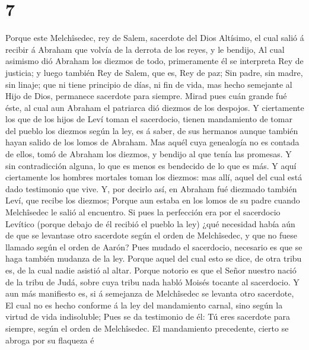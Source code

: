 \hypertarget{section-6}{%
\section{7}\label{section-6}}

 Porque este Melchîsedec, rey de Salem, sacerdote del Dios
Altísimo, el cual salió á recibir á Abraham que volvía de la derrota de
los reyes, y le bendijo,  Al cual asimismo dió Abraham los
diezmos de todo, primeramente él se interpreta Rey de justicia; y luego
también Rey de Salem, que es, Rey de paz;  Sin padre, sin
madre, sin linaje; que ni tiene principio de días, ni fin de vida, mas
hecho semejante al Hijo de Dios, permanece sacerdote para siempre.
 Mirad pues cuán grande fué éste, al cual aun Abraham el
patriarca dió diezmos de los despojos.  Y ciertamente los
que de los hijos de Leví toman el sacerdocio, tienen mandamiento de
tomar del pueblo los diezmos según la ley, es á saber, de sus hermanos
aunque también hayan salido de los lomos de Abraham.  Mas
aquél cuya genealogía no es contada de ellos, tomó de Abraham los
diezmos, y bendijo al que tenía las promesas.  Y sin
contradicción alguna, lo que es menos es bendecido de lo que es más.
 Y aquí ciertamente los hombres mortales toman los
diezmos: mas allí, aquel del cual está dado testimonio que vive.
 Y, por decirlo así, en Abraham fué diezmado también Leví,
que recibe los diezmos;  Porque aun estaba en los lomos
de su padre cuando Melchîsedec le salió al encuentro.  Si
pues la perfección era por el sacerdocio Levítico (porque debajo de él
recibió el pueblo la ley) ¿qué necesidad había aún de que se levantase
otro sacerdote según el orden de Melchîsedec, y que no fuese llamado
según el orden de Aarón?  Pues mudado el sacerdocio,
necesario es que se haga también mudanza de la ley. 
Porque aquel del cual esto se dice, de otra tribu es, de la cual nadie
asistió al altar.  Porque notorio es que el Señor nuestro
nació de la tribu de Judá, sobre cuya tribu nada habló Moisés tocante al
sacerdocio.  Y aun más manifiesto es, si á semejanza de
Melchîsedec se levanta otro sacerdote,  El cual no es
hecho conforme á la ley del mandamiento carnal, sino según la virtud de
vida indisoluble;  Pues se da testimonio de él: Tú eres
sacerdote para siempre, según el orden de Melchîsedec. 
El mandamiento precedente, cierto se abroga por su flaqueza é
